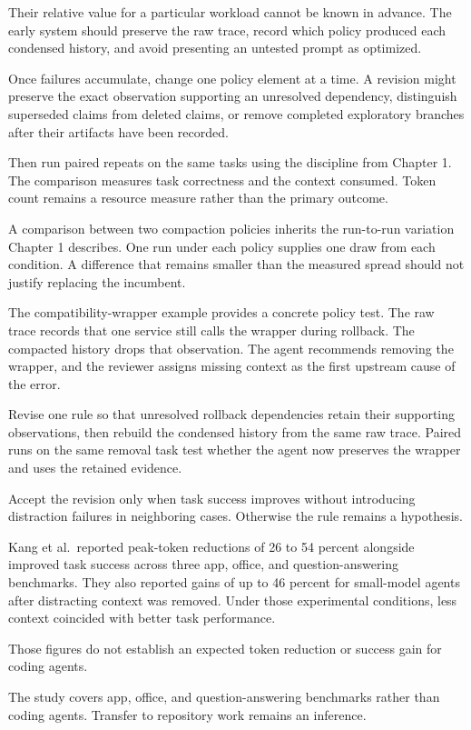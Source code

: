 Their relative value for a particular workload cannot be known in advance. The early system should preserve the raw trace, record which policy produced each condensed history, and avoid presenting an untested prompt as optimized.

Once failures accumulate, change one policy element at a time. A revision might preserve the exact observation supporting an unresolved dependency, distinguish superseded claims from deleted claims, or remove completed exploratory branches after their artifacts have been recorded.

Then run paired repeats on the same tasks using the discipline from Chapter 1. The comparison measures task correctness and the context consumed. Token count remains a resource measure rather than the primary outcome.

A comparison between two compaction policies inherits the run-to-run variation Chapter 1 describes. One run under each policy supplies one draw from each condition. A difference that remains smaller than the measured spread should not justify replacing the incumbent.

The compatibility-wrapper example provides a concrete policy test. The raw trace records that one service still calls the wrapper during rollback. The compacted history drops that observation. The agent recommends removing the wrapper, and the reviewer assigns missing context as the first upstream cause of the error.

Revise one rule so that unresolved rollback dependencies retain their supporting observations, then rebuild the condensed history from the same raw trace. Paired runs on the same removal task test whether the agent now preserves the wrapper and uses the retained evidence.

Accept the revision only when task success improves without introducing distraction failures in neighboring cases. Otherwise the rule remains a hypothesis.

Kang et al.~reported peak-token reductions of 26 to 54 percent alongside improved task success across three app, office, and question-answering benchmarks. They also reported gains of up to 46 percent for small-model agents after distracting context was removed. Under those experimental conditions, less context coincided with better task performance.

Those figures do not establish an expected token reduction or success gain for coding agents.

The study covers app, office, and question-answering benchmarks rather than coding agents. Transfer to repository work remains an inference.

